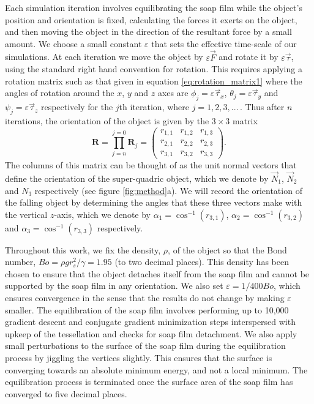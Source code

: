 \documentclass[preprint]{revtex4-1}
\begin{document}
Each simulation iteration involves equilibrating the soap film while the object's position and orientation is fixed, calculating the forces it exerts on the object, and then moving the object in the direction of the resultant force by a small amount. We choose a small constant $\varepsilon$ that sets the effective time-scale of our simulations. At each iteration we move the object by $\varepsilon\vec{F}$ and rotate it by $\varepsilon\vec{\tau}$, using the standard right hand convention for rotation. This requires applying a rotation matrix such as that given in equation \ref{eq:rotation_matrix1} where the angles of rotation around the $x$, $y$ and $z$ axes are $\phi_j=\varepsilon\vec{\tau}_x$, $\theta_j=\varepsilon\vec{\tau}_y$ and $\psi_j=\varepsilon\vec{\tau}_z$ respectively for the $j$th iteration, where $j=1,2,3,...\,$. Thus after $n$ iterations, the orientation of the object is given by the $3\times 3$ matrix 
\begin{equation}
\textbf{R} = \prod_{j=n}^{j=0} \textbf{R}_j= \left( \begin{array}{ccc}
r_{1,1} & r_{1,2} & r_{1,3} \\
r_{2,1} & r_{2,2} & r_{2,3} \\
r_{3,1} & r_{3,2} & r_{3,3} \end{array} \right).
\label{eq:orientation}
\end{equation}
The columns of this matrix can be thought of as the unit normal vectors that define the orientation of the super-quadric object, which we denote by $\vec{N}_1$, $\vec{N}_2$ and ${N}_3$ respectively (see figure \ref{fig:method}a). We will record the orientation of the falling object by determining the angles that these three vectors make with the vertical $z$-axis, which we denote by $\alpha_1=\cos^{-1}\left(r_{3,1}\right)$, $\alpha_2=\cos^{-1}\left(r_{3,2}\right)$ and $\alpha_3=\cos^{-1}\left(r_{3,3}\right)$ respectively.  

Throughout this work, we fix the density, $\rho$, of the object so that the Bond number, $Bo=\rho g r_s^2/\gamma=1.95$ (to two decimal places). This density has been chosen to ensure that the object detaches itself from the soap film and cannot be supported by the soap film in any orientation. We also set $\varepsilon=1/400Bo$, which ensures convergence in the sense that the results do not change by making $\varepsilon$ smaller. The equilibration of the soap film involves performing up to 10,000 gradient descent and conjugate gradient minimization steps interspersed with upkeep of the tessellation and checks for soap film detachment. We also apply small perturbations to the surface of the soap film during the equilibration process by jiggling the vertices slightly. This ensures that the surface is converging towards an absolute minimum energy, and not a local minimum. The equilibration process is terminated once the surface area of the soap film has converged to five decimal places.   
\end{document}
